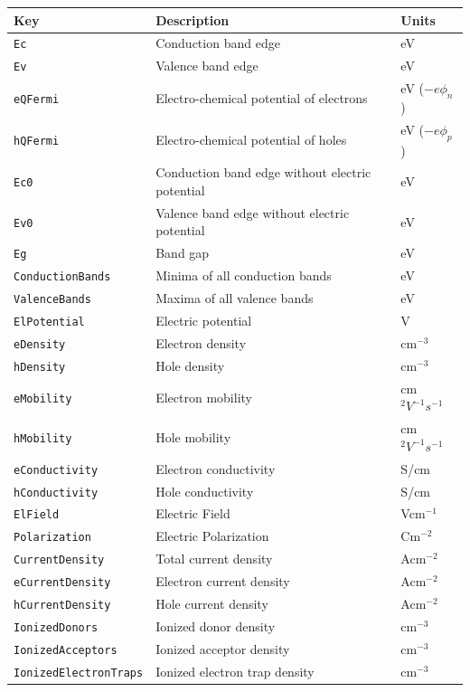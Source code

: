 \begin{table}[htb]
\center
\begin{tabular}{l|p{8cm}|l}
Key & Description & Units \\
\hline 
\texttt{Ec} & Conduction band edge & eV \\
\texttt{Ev} & Valence band edge & eV \\
\texttt{eQFermi} & Electro-chemical potential of electrons & eV ($-e\phi_n$) \\
\texttt{hQFermi} & Electro-chemical potential of holes & eV ($-e\phi_p$) \\
\texttt{Ec0} & Conduction band edge without electric potential & eV \\
\texttt{Ev0} & Valence band edge without electric potential & eV \\
\texttt{Eg} & Band gap & eV \\
\texttt{ConductionBands} & Minima of all conduction bands & eV \\
\texttt{ValenceBands} & Maxima of all valence bands & eV \\
\texttt{ElPotential} & Electric potential & V \\
\texttt{eDensity} & Electron density & cm$^{-3}$ \\
\texttt{hDensity} & Hole density & cm$^{-3}$ \\
\texttt{eMobility} & Electron mobility & cm$^2V^{-1}s^{-1}$ \\
\texttt{hMobility} & Hole mobility & cm$^2V^{-1}s^{-1}$ \\
\texttt{eConductivity} & Electron conductivity & S/cm \\
\texttt{hConductivity} & Hole conductivity & S/cm \\
\texttt{ElField} & Electric Field & Vcm$^{-1}$ \\
\texttt{Polarization} & Electric Polarization & Cm$^{-2}$ \\
\texttt{CurrentDensity} & Total current density & Acm$^{-2}$ \\
\texttt{eCurrentDensity} & Electron current density & Acm$^{-2}$ \\
\texttt{hCurrentDensity} & Hole current density & Acm$^{-2}$ \\
\texttt{IonizedDonors} & Ionized donor density & cm$^{-3}$ \\
\texttt{IonizedAcceptors} & Ionized acceptor density & cm$^{-3}$ \\
\texttt{IonizedElectronTraps} & Ionized electron trap density & cm$^{-3}$ \\

\end{tabular}
\end{table}
